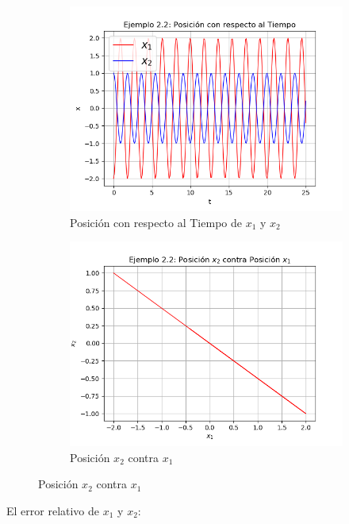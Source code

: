 \documentclass[a4paper]{article}
\begin{document}
\begin{figure}[ht!]
\begin{subfigure}{0.6\textwidth}
  \centering
  \includegraphics[width=\linewidth]{ejemplo_2_2_1.png}
   \caption{Posición con respecto al Tiempo de $x_1$ y $x_2$}
\end{subfigure}
\begin{subfigure}{0.6\textwidth}
  \centering
  \includegraphics[width=\linewidth]{ejemplo_2_2_2.png}
  \caption{Posición $x_2$ contra $x_1$}
\end{subfigure}
\end{figure}

El error relativo de $x_1$ y $x_2$:
\end{document}
